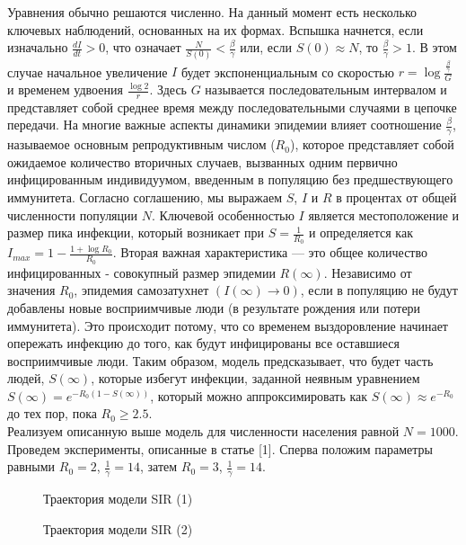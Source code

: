 \documentclass{article}
\begin{document}
\noindent Уравнения обычно решаются численно. На данный момент есть несколько ключевых наблюдений, основанных на их формах. Вспышка начнется, если изначально $\frac{dI}{dt} > 0$, что означает $\frac{N}{S(0)} < \frac{\beta}{\gamma} $ или, если $S(0) \approx N$, то $\frac{\beta}{\gamma}>1$. В этом случае начальное увеличение $I$ будет экспоненциальным со скоростью $r=\log \frac{\frac{\beta}{\gamma}}{G}$ и временем удвоения $\frac{\log 2}{r}$. Здесь $G$ называется последовательным интервалом и представляет собой среднее время между последовательными случаями в цепочке передачи. На многие важные аспекты динамики эпидемии влияет соотношение $\frac{\beta}{\gamma}$, называемое основным репродуктивным числом ($R_0$), которое представляет собой ожидаемое количество вторичных случаев, вызванных одним первично инфицированным индивидуумом, введенным в популяцию без предшествующего иммунитета. Согласно соглашению, мы выражаем $S$, $I$ и $R$ в процентах от общей численности популяции $N$. Ключевой особенностью $I$ является местоположение и размер пика инфекции, который возникает при $S=\frac{1}{R_0}$ и определяется как $I_{max}=1-\frac{1+\log R_0}{R_0}$. Вторая важная характеристика — это общее количество инфицированных - совокупный размер эпидемии $R(\infty)$. Независимо от значения $R_0$, эпидемия самозатухнет $(I(\infty) \rightarrow 0)$, если в популяцию не будут добавлены новые восприимчивые люди (в результате рождения или потери иммунитета). Это происходит потому, что со временем выздоровление начинает опережать инфекцию до того, как будут инфицированы все оставшиеся восприимчивые люди. Таким образом, модель предсказывает, что будет часть людей, $S(\infty)$, которые избегут инфекции, заданной неявным уравнением $S(\infty) = e^{-R_0 (1 - S(\infty))}$, который можно аппроксимировать как $S(\infty) \approx e^{-R_0}$ до тех пор, пока $R_0 \geq 2.5$.\\

\noindent Реализуем описанную выше модель для численности населения равной $N = 1000$. Проведем эксперименты, описанные в статье [1]. Сперва положим параметры равными $R_0=2$, $\frac{1}{\gamma}=14$, затем $R_0 = 3$, $\frac{1}{\gamma}=14$.

\begin{figure}[H]
    \caption{Траектория модели SIR (1)}
	\label{fig:image}
\end{figure}

\begin{figure}[H]
    \caption{Траектория модели SIR (2)}
	\label{fig:image}
\end{figure}
\end{document}
